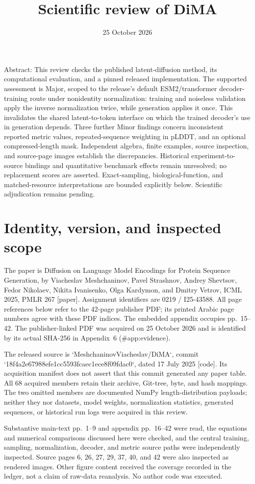 \documentclass[10pt]{article}
\title{Scientific review of DiMA}
\author{}
\date{25 October 2026}
\begin{document}
\maketitle
Abstract: This review checks the published latent-diffusion method, its computational evaluation, and a pinned released implementation. The supported assessment is Major, scoped to the release’s default ESM2/transformer decoder-training route under nonidentity normalization: training and noiseless validation apply the inverse normalization twice, while generation applies it once. This invalidates the shared latent-to-token interface on which the trained decoder’s use in generation depends. Three further Minor findings concern inconsistent reported metric values, repeated-sequence weighting in pLDDT, and an optional compressed-length mask. Independent algebra, finite examples, source inspection, and source-page images establish the discrepancies. Historical experiment-to-source bindings and quantitative benchmark effects remain unresolved; no replacement scores are asserted. Exact-sampling, biological-function, and matched-resource interpretations are bounded explicitly below. Scientific adjudication remains pending.\par
\section*{Identity, version, and inspected scope}
The paper is Diffusion on Language Model Encodings for Protein Sequence Generation, by Viacheslav Meshchaninov, Pavel Strashnov, Andrey Shevtsov, Fedor Nikolaev, Nikita Ivanisenko, Olga Kardymon, and Dmitry Vetrov, ICML 2025, PMLR 267 [paper]. Assignment identifiers are 0219 / I25-43588. All page references below refer to the 42-page publisher PDF; its printed Arabic page numbers agree with these PDF indices. The embedded appendix occupies pp. 15–42. The publisher-linked PDF was acquired on 25 October 2026 and is identified by its actual SHA-256 in Appendix 6 (\#app:evidence).\par
The released source is `MeshchaninovViacheslav/DiMA`, commit `18f4a2e67988efe1cc5593fcaec1ece8f09fdac0`, dated 17 July 2025 [code]. Its acquisition manifest does not assert that this commit generated any paper table. All 68 acquired members retain their archive, Git-tree, byte, and hash mappings. The two omitted members are documented NumPy length-distribution payloads; neither they nor datasets, model weights, normalization statistics, generated sequences, or historical run logs were acquired in this review.\par
Substantive main-text pp. 1–9 and appendix pp. 16–42 were read, the equations and numerical comparisons discussed here were checked, and the central training, sampling, normalization, decoder, and metric source paths were independently inspected. Source pages 6, 26, 27, 29, 37, 40, and 42 were also inspected as rendered images. Other figure content received the coverage recorded in the ledger, not a claim of raw-data reanalysis. No author code was executed.\par
\end{document}

